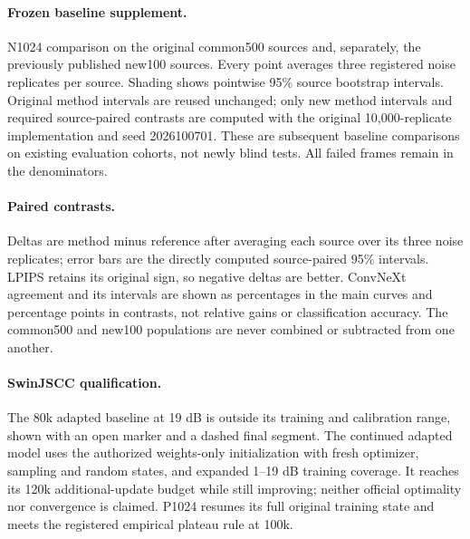 \paragraph{Frozen baseline supplement.} N1024 comparison on the original common500 sources and, separately, the previously published new100 sources. Every point averages three registered noise replicates per source. Shading shows pointwise 95\% source bootstrap intervals. Original method intervals are reused unchanged; only new method intervals and required source-paired contrasts are computed with the original 10,000-replicate implementation and seed 2026100701. These are subsequent baseline comparisons on existing evaluation cohorts, not newly blind tests. All failed frames remain in the denominators.

\paragraph{Paired contrasts.} Deltas are method minus reference after averaging each source over its three noise replicates; error bars are the directly computed source-paired 95\% intervals. LPIPS retains its original sign, so negative deltas are better. ConvNeXt agreement and its intervals are shown as percentages in the main curves and percentage points in contrasts, not relative gains or classification accuracy. The common500 and new100 populations are never combined or subtracted from one another.

\paragraph{SwinJSCC qualification.} The 80k adapted baseline at 19 dB is outside its training and calibration range, shown with an open marker and a dashed final segment. The continued adapted model uses the authorized weights-only initialization with fresh optimizer, sampling and random states, and expanded 1--19 dB training coverage. It reaches its 120k additional-update budget while still improving; neither official optimality nor convergence is claimed. P1024 resumes its full original training state and meets the registered empirical plateau rule at 100k.
